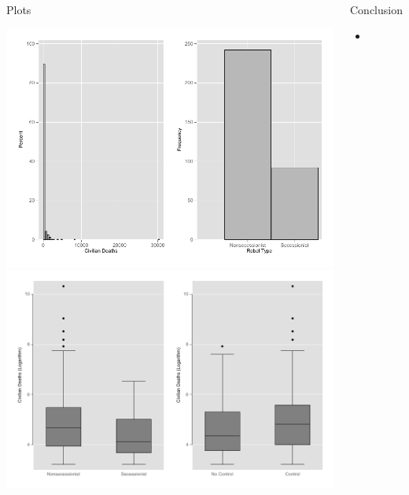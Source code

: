 \documentclass[mathserif]{beamer}
\begin{document}
\begin{frame}{~}
\begin{columns}[t]
\begin{block}{Plots}
\begin{multicols}{2}
		\includegraphics[width=1\linewidth, height=1\linewidth]{DVIVhist.pdf}
		\includegraphics[width=1\linewidth, height=1\linewidth]{DVIVTERRbox.pdf}
\end{multicols}
\end{block}

\begin{block}{Conclusion}
\begin{itemize}
\item
\end{itemize}
\end{block}

\end{columns}
\end{frame}
\end{document}
